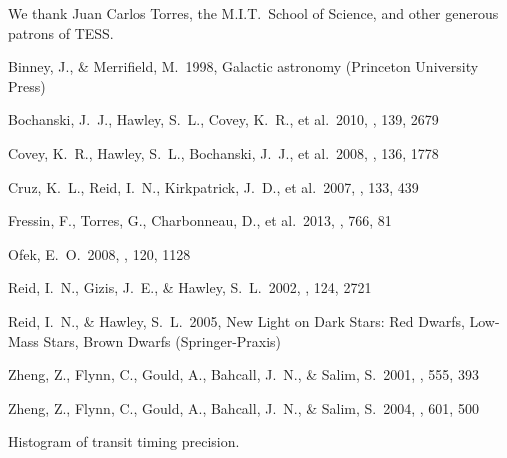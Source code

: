 \documentclass{emulateapj}
\begin{document}
\acknowledgments
We thank Juan Carlos Torres, the M.I.T.\ School of Science, and other
generous patrons of TESS.

\eject
\clearpage

\begin{thebibliography}{}

 Binney, J.,
  \& Merrifield, M.\ 1998, Galactic astronomy (Princeton University
  Press)

 Bochanski,
  J.~J., Hawley, S.~L., Covey, K.~R., et al.\ 2010, \aj, 139, 2679


 Covey, K.~R.,
  Hawley, S.~L., Bochanski, J.~J., et al.\ 2008, \aj, 136, 1778

 Cruz, K.~L., Reid,
  I.~N., Kirkpatrick, J.~D., et al.\ 2007, \aj, 133, 439
   
 Fressin, F., Torres, 
G., Charbonneau, D., et al.\ 2013, \apj, 766, 81 

 Ofek, E.~O.\ 2008, \pasp, 120, 
1128 

 Reid, I.~N., Gizis,
  J.~E., \& Hawley, S.~L.\ 2002, \aj, 124, 2721

 Reid, I.~N., \&
  Hawley, S.~L.\ 2005, New Light on Dark Stars: Red Dwarfs, Low-Mass
  Stars, Brown Dwarfs (Springer-Praxis)

 Zheng, Z., Flynn,
  C., Gould, A., Bahcall, J.~N., \& Salim, S.\ 2001, \apj, 555, 393

 Zheng, Z., Flynn,
  C., Gould, A., Bahcall, J.~N., \& Salim, S.\ 2004, \apj, 601, 500

\end{thebibliography}


Histogram of transit timing precision.
\end{document}
